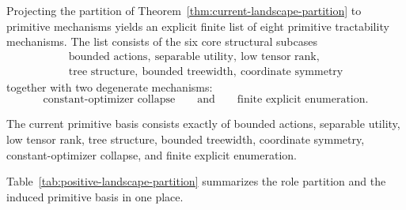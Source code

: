 \begin{corollary}\label{cor:finite-basis-current}
Projecting the partition of Theorem~\ref{thm:current-landscape-partition} to primitive mechanisms yields an explicit finite list of eight primitive tractability mechanisms. The list consists of the six core structural subcases
\[
\begin{gathered}
\text{bounded actions},\ \text{separable utility},\ \text{low tensor rank},\\
\text{tree structure},\ \text{bounded treewidth},\ \text{coordinate symmetry}
\end{gathered}
\]
together with two degenerate mechanisms:
\[
\text{constant-optimizer collapse}
\qquad\text{and}\qquad
\text{finite explicit enumeration}.
\]
\end{corollary}

\begin{proposition}\label{prop:explicit-basis}
The current primitive basis consists exactly of bounded actions, separable utility, low tensor rank, tree structure, bounded treewidth, coordinate symmetry, constant-optimizer collapse, and finite explicit enumeration.
\end{proposition}

Table~\ref{tab:positive-landscape-partition} summarizes the role partition and the induced primitive basis in one place.

